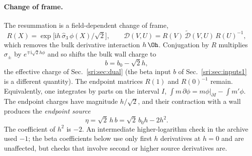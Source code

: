 \paragraph{Change of frame.} The resummation is a field-dependent change of frame,
\begin{equation}
 R(X)=\exp\bigl[\mathrm ih\,\hat\sigma_3\,\phi(X)/\sqrt2\bigr],\qquad
 \mathcal D(V,U)=R(V)\,\widetilde{\mathcal D}(V,U)\,R(U)^{-1},
\end{equation}
which removes the bulk derivative interaction $h\,\Oh$. Conjugation by $R$ multiplies $\hat\sigma_\pm$ by
$e^{\mp\mathrm i\sqrt2h\phi}$ and so shifts the bulk wall charge to
\begin{equation}
 b=b_0-\sqrt2h,
\end{equation}
the effective charge of Sec.~\ref{sri:sec:dual} (the beta input $b$ of Sec.~\ref{sri:sec:inputs1} is a different
quantity). The endpoint matrices $R(1)$ and $R(0)^{-1}$ remain. Equivalently, one integrates by parts on the
interval $I$, $\int m\,\partial\phi=m\phi|_{\partial I}-\int m'\phi$. The endpoint charges have magnitude $h/\sqrt2$,
and their contraction with a wall produces the \emph{endpoint source}
\begin{equation}
 \eta=\sqrt2\,h\,b=\sqrt2\,b_0h-2h^2.
 \label{sri:eq:dualA:eta}
\end{equation}
The coefficient of $h^2$ is $-2$. An intermediate higher-logarithm check in the archive used $-1$; the beta
coefficients below use only first $h$ derivatives at $h=0$ and are unaffected, but checks that involve second or
higher source derivatives are.

